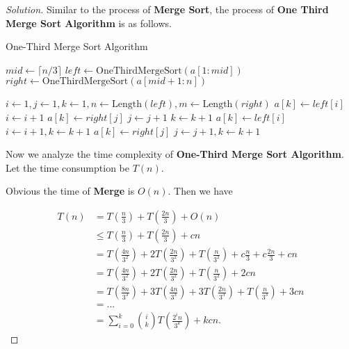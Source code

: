 \documentclass{article}
\newenvironment{solution}{\begin{proof}[\noindent\it Solution]}{\end{proof}}
\begin{document}
\begin{solution}
    Similar to the process of \textbf{Merge Sort}, the process of \textbf{One Third Merge Sort Algorithm} is as follows.
    
    \begin{algorithm}
        \caption{One-Third Merge Sort Algorithm}
        
	    {
	        $mid \gets \lceil n/3 \rceil$\;
	        $left \gets \mathrm{OneThirdMergeSort}\left(a[1:mid]\right)$\;
	        $right \gets \mathrm{OneThirdMergeSort}\left(a[mid+1:n]\right)$\;
	    }
	    
	    \BlankLine
	    \BlankLine
	    \BlankLine
	    
	    {
	        $i \gets 1, j \gets 1, k \gets 1, n \gets \mathrm{Length}(left), m \gets \mathrm{Length}(right)$\;
	        {
    	        {
    	           $a[k] \gets left[i]$\;
	                $i \gets i+1$\;
    	        }
	            {
	                $a[k] \gets right[j]$\;
	                $j \gets j+1$\;
	            }
	            $k \gets k+1$\;
	        }
	        {
	            $a[k] \gets left[i]$\;
	            $i\gets i+1, k\gets k+1$\;	    
	        }
	        {
	            $a[k] \gets right[j]$\;
	            $j\gets j+1, k\gets k+1$\;
	        }
	    }
    \end{algorithm}
    
    \hspace{1.3em}
    Now we analyze the time complexity of \textbf{One-Third Merge Sort Algorithm}. Let the time consumption be $T(n).$
    
    \hspace{1.3em}
    Obvious the time of \textbf{Merge} is $O(n)$. Then we have
    
    \vspace{-1.75em}
    \begin{align*}
        T(n) &= T\left(\frac{n}{3}\right)+T\left(\frac{2n}{3}\right)+O(n) \\
        &\le  T\left(\frac{n}{3}\right)+T\left(\frac{2n}{3}\right)+cn \\
        &= T\left(\frac{4n}{3^2}\right)+2T\left(\frac{2n}{3^2}\right)+T\left(\frac{n}{3^2}\right)+c\frac{n}{3}+c\frac{2n}{3}+cn \\
        &= T\left(\frac{4n}{3^2}\right)+2T\left(\frac{2n}{3^2}\right)+T\left(\frac{n}{3^2}\right)+2cn \\
        &= T\left(\frac{8n}{3^3}\right)+3T\left(\frac{4n}{3^3}\right)+3T\left(\frac{2n}{3^3}\right)+T\left(\frac{n}{3^3}\right) + 3cn \\
        &= ... \\
        &= \sum_{i=0}^{k}\binom{i}{k}T\left(\frac{2^i n}{3^k}\right) + kcn.
    \end{align*}
    

\end{solution}
\end{document}
